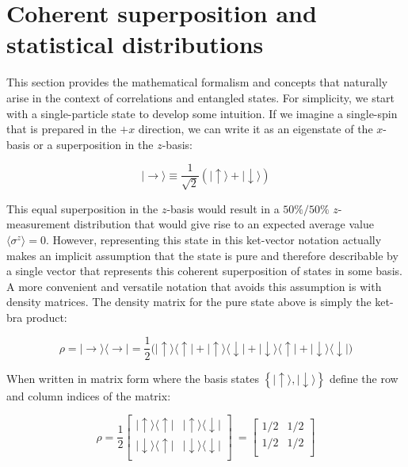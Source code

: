\section{Coherent superposition and statistical distributions} \label{sec:superPos}

This section provides the mathematical formalism and concepts that naturally arise in the context of correlations and entangled states. For simplicity, we start with a single-particle state to develop some intuition. If we imagine a single-spin that is prepared in the $+x$ direction, we can write it as an eigenstate of the $x$-basis or a superposition in the $z$-basis:

\[
| \rightarrow \rangle \equiv \frac{1}{\sqrt{2}} \left ( | \uparrow \rangle + | \downarrow \rangle \right )
\]

This equal superposition in the $z$-basis would result in a $50\%/50\%$ $z$-measurement distribution that would give rise to an expected average value $\langle \sigma^z \rangle = 0$. However, representing this state in this ket-vector notation actually makes an implicit assumption that the state is pure and therefore describable by a single vector that represents this coherent superposition of states in some basis. A more convenient and versatile notation that avoids this assumption is with density matrices. The density matrix for the pure state above is simply the ket-bra product:

\[
\rho = | \rightarrow \rangle \langle \rightarrow | =  \frac{1}{2} \Big ( | \uparrow \rangle \langle \uparrow | + | \uparrow \rangle \langle \downarrow | + | \downarrow \rangle \langle \uparrow | + | \downarrow \rangle \langle \downarrow | \Big )
\]

When written in matrix form where the basis states $\left \{ | \uparrow \rangle, | \downarrow \rangle \right \}$ define the row and column indices of the matrix:

\[
\rho = \frac{1}{2} \begin{bmatrix}
  | \uparrow \rangle \langle \uparrow |  & | \uparrow \rangle \langle \downarrow | \\
 | \downarrow \rangle \langle \uparrow |  & | \downarrow \rangle \langle \downarrow | \\
\end{bmatrix}\
=
 \begin{bmatrix}
 1/2 & 1/2 \\
 1/2 & 1/2 \\
\end{bmatrix}\]

